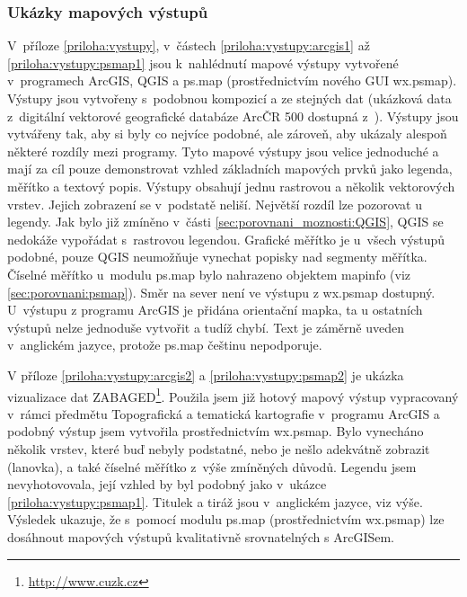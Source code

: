 \documentclass[a4paper,12pt,draft]{article}
\begin{document}
\subsubsection{Ukázky mapových výstupů}
V~příloze \ref{priloha:vystupy}, v~částech \ref{priloha:vystupy:arcgis1} až
\ref{priloha:vystupy:psmap1} jsou k~nahlédnutí mapové výstupy vytvořené
 v~programech ArcGIS, QGIS a ps.map (prostřednictvím nového GUI
wx.psmap). 
Výstupy jsou vytvořeny s~podobnou kompozicí a ze stejných dat (ukázková data
z~digitální vektorové geografické databáze ArcČR 500 dostupná
z~\cite{ArcCR500}). Výstupy jsou vytvářeny tak, aby si byly co nejvíce podobné,
ale zároveň, aby ukázaly alespoň některé  rozdíly mezi programy.
Tyto mapové výstupy jsou velice jednoduché a mají za cíl pouze demonstrovat
vzhled základních mapových prvků jako legenda, měřítko a textový popis. Výstupy
obsahují jednu rastrovou a několik vektorových vrstev. Jejich zobrazení se
v~podstatě neliší. Největší rozdíl lze pozorovat u legendy. Jak bylo již zmíněno
v~části \ref{sec:porovnani_moznosti:QGIS}, QGIS se nedokáže vypořádat
s~rastrovou legendou. Grafické měřítko je u~všech výstupů podobné, pouze QGIS
neumožňuje vynechat popisky nad segmenty měřítka. Číselné měřítko u~modulu
ps.map bylo nahrazeno objektem mapinfo (viz \ref{sec:porovnani:psmap}). Směr na
sever není ve výstupu z wx.psmap dostupný. U~výstupu z programu ArcGIS je
přidána orientační mapka, ta u ostatních výstupů nelze jednoduše
vytvořit a tudíž chybí. Text je záměrně uveden v~anglickém jazyce, protože
ps.map češtinu nepodporuje.

V příloze \ref{priloha:vystupy:arcgis2} a \ref{priloha:vystupy:psmap2} je
ukázka vizualizace dat ZABAGED\footnote{\url{http://www.cuzk.cz}}. Použila jsem
již hotový mapový výstup vypracovaný v~rámci předmětu Topografická a tematická
kartografie \cite{TTKH} v~programu ArcGIS a podobný výstup jsem vytvořila
prostřednictvím wx.psmap. Bylo vynecháno několik vrstev, které buď nebyly
podstatné, nebo je nešlo adekvátně zobrazit (lanovka), a také číselné měřítko
z~výše zmíněných důvodů. Legendu jsem nevyhotovovala, její vzhled by byl
podobný jako v~ukázce \ref{priloha:vystupy:psmap1}. Titulek a tiráž jsou
v~anglickém jazyce, viz výše. Výsledek ukazuje, že s~pomocí modulu ps.map
(prostřednictvím wx.psmap) lze dosáhnout mapových výstupů kvalitativně
srovnatelných s ArcGISem.
\end{document}
